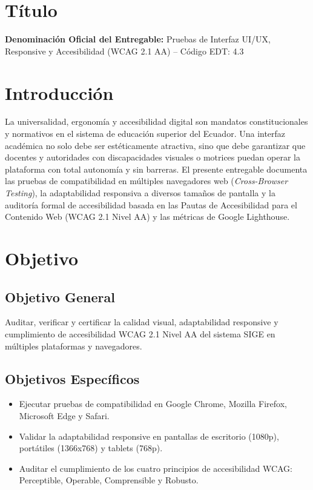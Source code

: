 \documentclass[12pt,a4paper]{article}
\begin{document}

\vspace{0.25cm}

\section{Título}
\textbf{Denominación Oficial del Entregable:} Pruebas de Interfaz UI/UX, Responsive y Accesibilidad (WCAG 2.1 AA) -- Código EDT: 4.3

\section{Introducción}
La universalidad, ergonomía y accesibilidad digital son mandatos constitucionales y normativos en el sistema de educación superior del Ecuador. Una interfaz académica no solo debe ser estéticamente atractiva, sino que debe garantizar que docentes y autoridades con discapacidades visuales o motrices puedan operar la plataforma con total autonomía y sin barreras. El presente entregable documenta las pruebas de compatibilidad en múltiples navegadores web (\textit{Cross-Browser Testing}), la adaptabilidad responsiva a diversos tamaños de pantalla y la auditoría formal de accesibilidad basada en las Pautas de Accesibilidad para el Contenido Web (WCAG 2.1 Nivel AA) y las métricas de Google Lighthouse.

\section{Objetivo}
\subsection{Objetivo General}
Auditar, verificar y certificar la calidad visual, adaptabilidad responsive y cumplimiento de accesibilidad WCAG 2.1 Nivel AA del sistema SIGE en múltiples plataformas y navegadores.
\subsection{Objetivos Específicos}
\begin{itemize}[leftmargin=1.5em, itemsep=2pt]
    \item Ejecutar pruebas de compatibilidad en Google Chrome, Mozilla Firefox, Microsoft Edge y Safari.
    \item Validar la adaptabilidad responsive en pantallas de escritorio (1080p), portátiles (1366x768) y tablets (768p).
    \item Auditar el cumplimiento de los cuatro principios de accesibilidad WCAG: Perceptible, Operable, Comprensible y Robusto.
\end{itemize}
\end{document}
